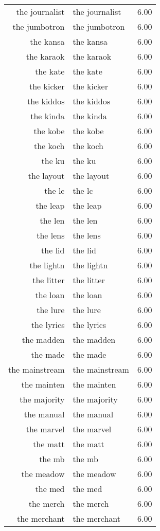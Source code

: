 \begin{table}[ht]
\begin{tabular}{rlr}
  the journalist & the journalist & 6.00 \\ 
  the jumbotron & the jumbotron & 6.00 \\ 
  the kansa & the kansa & 6.00 \\ 
  the karaok & the karaok & 6.00 \\ 
  the kate & the kate & 6.00 \\ 
  the kicker & the kicker & 6.00 \\ 
  the kiddos & the kiddos & 6.00 \\ 
  the kinda & the kinda & 6.00 \\ 
  the kobe & the kobe & 6.00 \\ 
  the koch & the koch & 6.00 \\ 
  the ku & the ku & 6.00 \\ 
  the layout & the layout & 6.00 \\ 
  the lc & the lc & 6.00 \\ 
  the leap & the leap & 6.00 \\ 
  the len & the len & 6.00 \\ 
  the lens & the lens & 6.00 \\ 
  the lid & the lid & 6.00 \\ 
  the lightn & the lightn & 6.00 \\ 
  the litter & the litter & 6.00 \\ 
  the loan & the loan & 6.00 \\ 
  the lure & the lure & 6.00 \\ 
  the lyrics & the lyrics & 6.00 \\ 
  the madden & the madden & 6.00 \\ 
  the made & the made & 6.00 \\ 
  the mainstream & the mainstream & 6.00 \\ 
  the mainten & the mainten & 6.00 \\ 
  the majority & the majority & 6.00 \\ 
  the manual & the manual & 6.00 \\ 
  the marvel & the marvel & 6.00 \\ 
  the matt & the matt & 6.00 \\ 
  the mb & the mb & 6.00 \\ 
  the meadow & the meadow & 6.00 \\ 
  the med & the med & 6.00 \\ 
  the merch & the merch & 6.00 \\ 
  the merchant & the merchant & 6.00 \\ 

\end{tabular}
\end{table}
